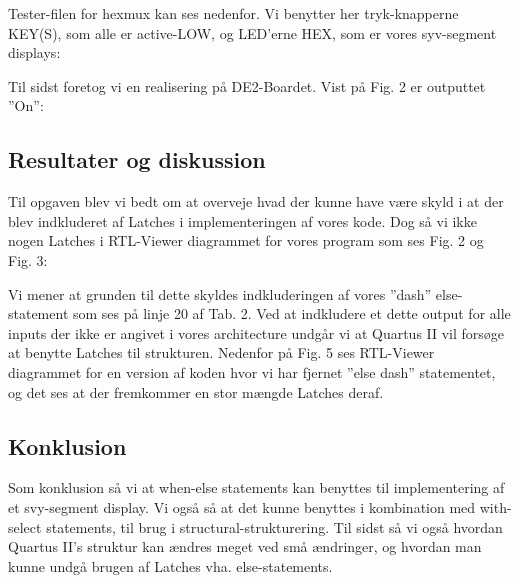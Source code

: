 \documentclass[../journal2.tex]{subfiles}
\begin{document}
Tester-filen for hex\textunderscore mux kan ses nedenfor. Vi benytter her tryk-knapperne KEY(S), som alle er active-LOW, og LED'erne HEX, som er vores syv-segment displays:

\begin{table}[H]
    \centering
      \framebox{
        \rule{8pt}{0pt}
          
  }
  \caption{Architecture af hex\textunderscore mux\textunderscore test}
  \label{src:hex_mux_arch_test}
\end{table}

Til sidst foretog vi en realisering på DE2-Boardet. Vist på Fig. 2 er outputtet ''On'':


\subsection{Resultater og diskussion}

Til opgaven blev vi bedt om at overveje hvad der kunne have være skyld i at der blev indkluderet af Latches i implementeringen af vores kode. Dog så vi ikke nogen Latches i RTL-Viewer diagrammet for vores program som ses Fig. 2 og Fig. 3:


Vi mener at grunden til dette skyldes indkluderingen af vores ''dash'' else-statement som ses på linje 20 af Tab. 2. Ved at indkludere et dette output for alle inputs der ikke er angivet i vores architecture undgår vi at Quartus II vil forsøge at benytte Latches til strukturen. Nedenfor på Fig. 5 ses RTL-Viewer diagrammet for en version af koden hvor vi har fjernet ''else dash'' statementet, og det ses at der fremkommer en stor mængde Latches deraf.


\subsection{Konklusion}

Som konklusion så vi at when-else statements kan benyttes til implementering af et svy-segment display. Vi også så at det kunne benyttes i kombination med with-select statements, til brug i structural-strukturering. Til sidst så vi også hvordan Quartus II's struktur kan ændres meget ved små ændringer, og hvordan man kunne undgå brugen af Latches vha. else-statements.
\end{document}
